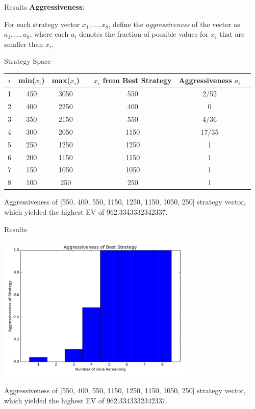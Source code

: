 \documentclass{beamer}
\begin{document}
  \begin{frame}{Results}
	\textbf{Aggressiveness}: 
    
    For each strategy vector $x_1, ..., x_8$, define the \textit{aggressiveness} of the vector as $a_1, ..., a_8$, where each $a_i$ denotes the fraction of possible values for $x_i$ that are smaller than $x_i$.
  \end{frame}
  
    \begin{frame}{Strategy Space}
	\begin{table}[]
	\centering
	\begin{tabular}{|c|c|c|c|c|c|c}
	\hline
$i$  & min($x_i$) & max($x_i$)  & & $x_i$ from Best Strategy & Aggressiveness $a_i$  \\ \hline
1    & 450        & 3050        & & 550           & 2$/$52  \\ \hline
2    & 400        & 2250        & & 400           & 0       \\ \hline
3    & 350        & 2150        & & 550           & 4$/$36  \\ \hline
4    & 300        & 2050        & & 1150          & 17$/$35 \\ \hline
5    & 250        & 1250        & & 1250          & 1       \\ \hline
6    & 200        & 1150        & & 1150          & 1       \\ \hline
7    & 150        & 1050        & & 1050          & 1       \\ \hline
8    & 100        & 250         & & 250           & 1       \\ \hline
	\end{tabular}
  \end{table}
    Aggressiveness of [550, 400, 550, 1150, 1250, 1150, 1050, 250] strategy vector, which yielded the highest EV of 962.3343332342337.
  \end{frame}

  \begin{frame}{Results}
  \begin{center}
  \includegraphics[width = 0.7\textwidth]{aggressiveness_barplot.png}
  \end{center}
  Aggressiveness of [550, 400, 550, 1150, 1250, 1150, 1050, 250] strategy vector, which yielded the highest EV of 962.3343332342337.
  \end{frame}
\end{document}
